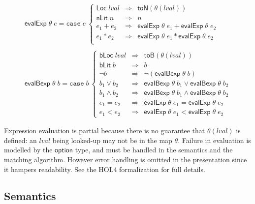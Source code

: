 \documentclass[a4paper,UKenglish,cleveref, autoref, thm-restate]{lipics-v2021}
\newcommand{\konst}[1]{\ensuremath{\mathsf{#1}}}
\newcommand{\lval}{\ensuremath{\mathit{lval}}}
\begin{document}
\[
\begin{array}{l}
\konst{evalExp} \;\theta \; e =
\mathtt{case}\; e\
 \left\{
 \begin{array}{lcl}
    \konst{Loc}\; \lval & \Rightarrow & \konst{toN}(\theta(\lval)) \\
    \konst{nLit}\; n & \Rightarrow & n  \\
    e_1 + e_2 & \Rightarrow & \konst{evalExp}\;\theta\; e_1 + \konst{evalExp}\;\theta\; e_2  \\
    e_1 * e_2 & \Rightarrow & \konst{evalExp}\;\theta\; e_1 * \konst{evalExp}\;\theta\; e_2  \\
  \end{array}
 \right.
 \\ \\
\konst{evalBexp}\;\theta \; b =
\mathtt{case}\; b\
 \left\{
 \begin{array}{lcl}
    \konst{bLoc}\; \lval & \Rightarrow & \konst{toB}(\theta(\lval)) \\
    \konst{bLit}\; b & \Rightarrow & b \\
    \neg b & \Rightarrow & \neg(\konst{evalBexp}\;\theta \; b)  \\
    b_1 \lor b_2 & \Rightarrow & \konst{evalBexp}\;\theta \;b_1 \lor \konst{evalBexp}\;\theta \;b_2   \\
    b_1 \land b_2 & \Rightarrow & \konst{evalBexp}\;\theta \;b_1 \land \konst{evalBexp}\;\theta \;b_2   \\
    e_1 = e_2 & \Rightarrow & \konst{evalExp}\;\theta \;e_1 = \konst{evalExp}\;\theta \;e_2   \\
    e_1 < e_2 & \Rightarrow & \konst{evalExp}\;\theta \;e_1 < \konst{evalExp}\;\theta \;e_2
  \end{array}
 \right.

\end{array}
\]

\begin{remark}[Partiality]
Expression evaluation is partial because there is no guarantee that
$\theta(\lval)$ is defined: an \lval{} being looked-up may not be in the
map $\theta$. Failure in evaluation is modelled by the \konst{option}
type, and must be handled in the semantics and the matching
algorithm. However error handling is omitted in the presentation since
it hampers readability. See the HOL4 formalization for full details.
\end{remark}

\subsection{Semantics}
\end{document}
